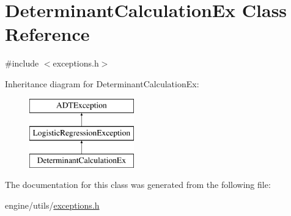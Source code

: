 \hypertarget{classDeterminantCalculationEx}{
\section{DeterminantCalculationEx Class Reference}
\label{classDeterminantCalculationEx}
}


{\ttfamily \#include $<$exceptions.h$>$}

Inheritance diagram for DeterminantCalculationEx:\begin{figure}[H]
\begin{center}
\leavevmode
\includegraphics[height=3cm]{classDeterminantCalculationEx}
\end{center}
\end{figure}


The documentation for this class was generated from the following file:\begin{DoxyCompactItemize}
\item 
engine/utils/\hyperlink{exceptions_8h}{exceptions.h}\end{DoxyCompactItemize}
